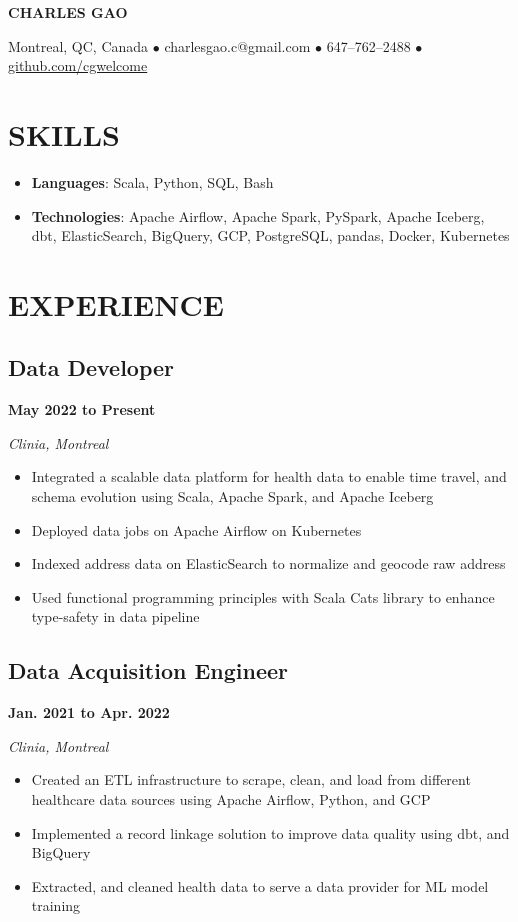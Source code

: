 \documentclass[12pt]{extarticle}
\begin{document}
\begin{center}
\textbf{\huge{CHARLES GAO}}

Montreal, QC, Canada
$\bullet$ charlesgao.c@gmail.com
$\bullet$ 647--762--2488
$\bullet$ \href{https://github.com/cgwelcome}{github.com/cgwelcome}
\end{center}

\section*{SKILLS}
\begin{itemize}
  \item \textbf{Languages}: Scala, Python, SQL, Bash
  \item \textbf{Technologies}: Apache Airflow, Apache Spark, PySpark, Apache Iceberg, dbt, ElasticSearch, BigQuery, GCP, PostgreSQL, pandas, Docker, Kubernetes
\end{itemize}



\section*{EXPERIENCE}

\subsection*{Data Developer} \hfill \textbf{May 2022 to Present}

\textit{Clinia, Montreal}
\begin{itemize}
  \item Integrated a scalable data platform for health data to enable time travel, and schema evolution using Scala, Apache Spark, and Apache Iceberg
  \item Deployed data jobs on Apache Airflow on Kubernetes
  \item Indexed address data on ElasticSearch to normalize and geocode raw address
  \item Used functional programming principles with Scala Cats library to enhance type-safety in data pipeline
\end{itemize}

\subsection*{Data Acquisition Engineer} \hfill \textbf{Jan. 2021 to Apr. 2022}

\textit{Clinia, Montreal}
\begin{itemize}
  \item Created an ETL infrastructure to scrape, clean, and load from different healthcare data sources using Apache Airflow, Python, and GCP
  \item Implemented a record linkage solution to improve data quality using dbt, and BigQuery
  \item Extracted, and cleaned health data to serve a data provider for ML model training
\end{itemize}
\end{document}

